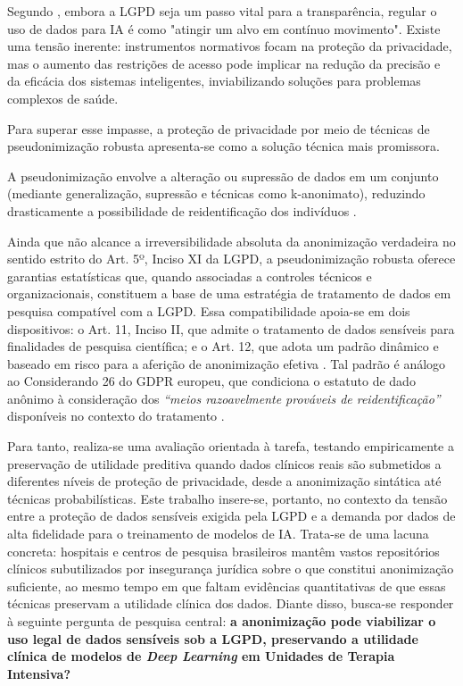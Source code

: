 Segundo , embora a LGPD seja um passo vital para a transparência, regular o uso de dados para IA é como "atingir um alvo em contínuo movimento". Existe uma tensão inerente: instrumentos normativos focam na proteção da privacidade, mas o aumento das restrições de acesso pode implicar na redução da precisão e da eficácia dos sistemas inteligentes, inviabilizando soluções para problemas complexos de saúde.

Para superar esse impasse, a proteção de privacidade por meio de técnicas de pseudonimização robusta apresenta-se como a solução técnica mais promissora.

A pseudonimização envolve a alteração ou supressão de dados em um conjunto (mediante generalização, supressão e técnicas como k-anonimato), reduzindo drasticamente a possibilidade de reidentificação dos indivíduos \cite{Sousa2020}.

Ainda que não alcance a irreversibilidade absoluta da anonimização verdadeira no sentido estrito do Art. 5º, Inciso XI da LGPD, a pseudonimização robusta oferece garantias estatísticas que, quando associadas a controles técnicos e organizacionais, constituem a base de uma estratégia de tratamento de dados em pesquisa compatível com a LGPD. Essa compatibilidade apoia-se em dois dispositivos: o Art. 11, Inciso II, que admite o tratamento de dados sensíveis para finalidades de pesquisa científica; e o Art. 12, que adota um padrão dinâmico e baseado em risco para a aferição de anonimização efetiva \cite{ANPD2023juridica}. Tal padrão é análogo ao Considerando 26 do GDPR europeu, que condiciona o estatuto de dado anônimo à consideração dos \textit{``meios razoavelmente prováveis de reidentificação''} disponíveis no contexto do tratamento \cite{GDPR2016}.

Para tanto, realiza-se uma avaliação orientada à tarefa, testando empiricamente a preservação de utilidade preditiva quando dados clínicos reais são submetidos a diferentes níveis de proteção de privacidade, desde a anonimização sintática até técnicas probabilísticas. Este trabalho insere-se, portanto, no contexto da tensão entre a proteção de dados sensíveis exigida pela LGPD e a demanda por dados de alta fidelidade para o treinamento de modelos de IA. Trata-se de uma lacuna concreta: hospitais e centros de pesquisa brasileiros mantêm vastos repositórios clínicos subutilizados por insegurança jurídica sobre o que constitui anonimização suficiente, ao mesmo tempo em que faltam evidências quantitativas de que essas técnicas preservam a utilidade clínica dos dados. Diante disso, busca-se responder à seguinte pergunta de pesquisa central: \textbf{a anonimização pode viabilizar o uso legal de dados sensíveis sob a LGPD, preservando a utilidade clínica de modelos de \textit{Deep Learning} em Unidades de Terapia Intensiva?}


